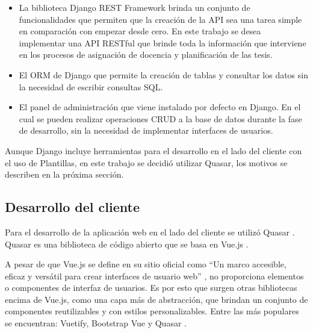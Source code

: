 \begin{itemize}
    \item La biblioteca Django REST Framework brinda un conjunto de funcionalidades 
    que permiten que la creación de la API sea una tarea simple en comparación con empezar desde cero. En este trabajo se desea implementar una API RESTful que brinde toda la 
    información que interviene en los procesos de asignación de docencia y planificación de las 
    tesis. 
    \item El ORM de Django que permite la creación de tablas y consultar los datos sin la necesidad 
    de escribir consultas SQL. 
    \item El panel de administración que viene instalado por defecto en Django. En el cual se 
    pueden realizar operaciones CRUD a la base de datos durante la fase de desarrollo, sin la 
    necesidad de implementar interfaces de usuarios.
\end{itemize}


Aunque Django incluye herramientas para el desarrollo en el lado del cliente con el uso 
de Plantillas, en este trabajo se decidió utilizar Quasar, los motivos se describen en la próxima sección.


\subsection{Desarrollo del cliente}
Para el desarrollo de la aplicación web en el lado del cliente se utilizó Quasar \cite{quasar}. 
Quasar es una biblioteca de código abierto que se basa en Vue.js \cite{vuejs}.

A pesar de que Vue.js se define en su sitio oficial como 
``Un marco accesible, eficaz y versátil para crear interfaces de usuario web'' \cite{vuejs},
no proporciona elementos o componentes de interfaz de usuarios. Es por esto que surgen  
otras bibliotecas encima de Vue.js, como una capa más de abstracción, que 
brindan un conjunto de componentes reutilizables y con estilos personalizables. Entre 
las más populares se encuentran: Vuetify, Bootstrap Vue y Quasar \cite{vuejs-frameworks}.




